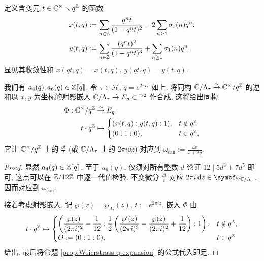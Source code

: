 定义含变元 $t \in \mathbb{C}^\times \smallsetminus q^{\mathbb{Z}}$ 的函数
\begin{align*}
	x(t, q) & := \sum_{n \in \mathbb{Z}} \frac{q^n t}{(1 - q^n t)^2} - 2\sum_{n \geq 1} \sigma_1(n) q^n, \\
	y(t, q) & := \sum_{n \in \mathbb{Z}} \frac{(q^n t)^2}{(1 - q^n t)^3} + \sum_{n \geq 1} \sigma_1(n) q^n.
\end{align*}
显见其收敛性和 $x(qt, q) = x(t, q)$, $y(qt, q) = y(t, q)$.

\begin{proposition}\label{prop:Tate-Weierstrass} 
	我们有 $a_4(q), a_6(q) \in \mathbb{Z}\llbracket q\rrbracket$. 令 $\tau \in \mathcal{H}$, $q = e^{2\pi i\tau}$ 如上. 将同构 $\mathbb{C}/\Lambda_\tau \stackrel{\sim}{\rightarrow} \mathbb{C}^\times/q^{\mathbb{Z}}$ 的逆和以 $x, y$ 为坐标的射影嵌入 $\mathbb{C}/\Lambda_\tau \stackrel{\sim}{\rightarrow} E_q \subset \mathbb{P}^2$ 作合成, 这将给出同构
	\begin{equation}\label{eqn:Tate-Eq}\begin{aligned}
		\Phi: \mathbb{C}^\times/q^{\mathbb{Z}} & \stackrel{\sim}{\rightarrow} E_q \\
		t \cdot q^{\mathbb{Z}} & \mapsto \begin{cases}
			(x(t, q) : y(t, q) : 1), & t \notin q^{\mathbb{Z}} \\
			(0:1:0), & t \in q^{\mathbb{Z}},
		\end{cases}
	\end{aligned}\end{equation}
	它让 $\mathbb{C}^\times/q^{\mathbb{Z}}$ 上的 $\frac{\dd t}{t}$ (或 $\mathbb{C}/\Lambda_\tau$ 上的 $2\pi i \dd z$) 对应到 $\omega_{\mathrm{can}} := \frac{\dd x}{x + 2y}$.
\end{proposition}
\begin{proof}
	显然 $a_4(q) \in \mathbb{Z}\llbracket q\rrbracket$. 至于 $a_6(q)$, 仅须对所有整数 $d$ 论证 $12 \mid 5 d^3 + 7d^5$ 即可; 这点可以在 $\mathbb{Z}/12\mathbb{Z}$ 中逐一代值检验. 不变微分 $\frac{\dd t}{t}$ 对应 $2\pi i \dd z \in \bomega_{\CC/\Lambda_\tau}$, 因而对应到 $\omega_{\mathrm{can}}$.
	
	接着考虑射影嵌入. 记 $\wp(z) = \wp_{\Lambda_\tau}(z)$, $t := e^{2\pi iz}$. 嵌入 $\Phi$ 由
	\[ t \cdot q^{\mathbb{Z}} \mapsto \begin{cases}
		\left( \dfrac{\wp(z)}{(2\pi i)^2} - \dfrac{1}{12} : \dfrac{1}{2}\left( \dfrac{\wp'(z)}{(2\pi i)^3} - \dfrac{\wp(z)}{(2\pi i)^2} + \dfrac{1}{12} \right) : 1 \right), & t \notin q^{\mathbb{Z}}, \\
		O := (0:1:0), &  t \in q^{\mathbb{Z}}
	\end{cases}\]
	给出. 最后将命题 \ref{prop:Weierstrass-q-expansion} 的公式代入即足.
\end{proof}

